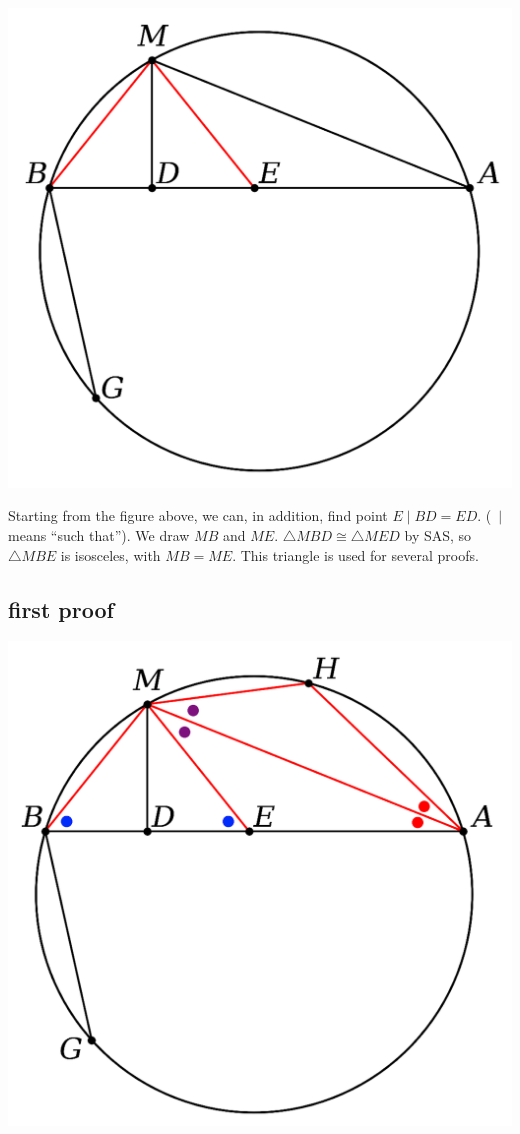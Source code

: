 \documentclass[11pt, oneside]{article}
\begin{document}
\begin{center} \includegraphics [scale=0.30] {bc0.png} \end{center}

Starting from the figure above, we can, in addition, find point $E \mid BD = ED$.  ($\ \mid \ $ means ``such that'').  We draw $MB$ and $ME$.  $\triangle MBD \cong \triangle MED$ by SAS, so $\triangle MBE$ is isosceles, with $MB = ME$.  This triangle is used for several proofs.

\newpage

\subsection*{first proof}
\begin{center} \includegraphics [scale=0.40] {bc1.png} \end{center}
\end{document}
